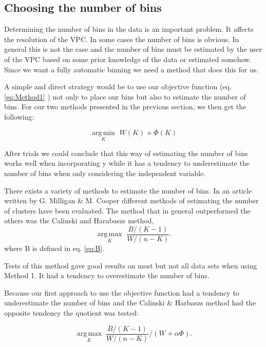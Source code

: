 \subsection{Choosing the number of bins}
Determining the number of bins in the data is an important problem. It affects the resolution of the VPC. In some cases the number of bins is obvious. In general this is not the case and the number of bins must be estimated by the user of the VPC based on some prior knowledge of the data or estimated somehow. Since we want a fully automatic binning we need a method that does this for us.
\par
A simple and direct strategy would be to use our objective function (eq. \ref{eq:Method1} ) not only to place our bins but also to estimate the number of bins. For our two methods presented in the previous section, we then get the following: 

\begin{equation}
	  \underset{K}{\operatorname{arg\,min}} \,\, W(K) + \Phi(K)
\end{equation}

After trials we could conclude that this way of estimating the number of bins works well when incorporating y while it has a tendency to underestimate the number of bins when only considering the independent variable. 
\par
There exists a variety of methods to estimate the number of bins. In an article written by G. Milligan \& M. Cooper \cite{Milligan} different methods of estimating the number of clusters have been evaluated. The method that in general outperformed the others was the Calinski and Harabaszs method,
\begin{equation}
	\underset{K}{\operatorname{arg\,max}}\,\, \frac{B/(K-1)}{W/(n-K)}.
\end{equation}
where B is defined in eq. \ref{eq:B}.

Tests of this method gave good results on most but not all data sets when using Method 1. It had a tendency to overestimate the number of bins.
\par
Because our first approach to use the objective function had a tendency to underestimate the number of bins and the Calinski \& Harbaszs method had the opposite tendency the quotient was tested:

\begin{equation}
	\underset{K}{\operatorname{arg\,max}}\,\, \frac{B/(K-1)}{W/(n-K)} / (W + \alpha\Phi).
	\label{eq:estimateK}
\end{equation}

